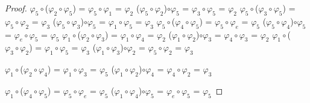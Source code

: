 \documentclass[10pt,a4paper,oneside]{article}
\begin{document}
\begin{proof}
				\newline
				\newline
				$\varphi_{5}\circ$($\varphi_{2}\circ\varphi_{5}$) = $\varphi_{5}\circ\varphi_{1}$ = $\varphi_{2}$
				\newline
				($\varphi_{5}\circ\varphi_{2}$)$\circ\varphi_{5}$ = $\varphi_{3}\circ\varphi_{5}$ = $\varphi_{2}$
				\newline
				\newline
				$\varphi_{5}\circ$($\varphi_{3}\circ\varphi_{5}$) = $\varphi_{5}\circ\varphi_{2}$ = $\varphi_{3}$
				\newline
				($\varphi_{5}\circ\varphi_{3}$)$\circ\varphi_{5}$ = $\varphi_{1}\circ\varphi_{5}$ = $\varphi_{3}$
				\newline
				\newline
				$\varphi_{5}\circ$($\varphi_{4}\circ\varphi_{5}$) = $\varphi_{5}\circ\varphi_{e}$ = $\varphi_{5}$
				\newline
				($\varphi_{5}\circ\varphi_{4}$)$\circ\varphi_{5}$ = $\varphi_{e}\circ\varphi_{5}$ = $\varphi_{5}$
				\newline
				\newline
				$\varphi_{1}\circ$($\varphi_{2}\circ\varphi_{3}$) = $\varphi_{1}\circ\varphi_{4}$ = $\varphi_{2}$
				\newline
				($\varphi_{1}\circ\varphi_{2}$)$\circ\varphi_{3}$ = $\varphi_{4}\circ\varphi_{3}$ = $\varphi_{2}$
				\newline
				\newline
				$\varphi_{1}\circ$($\varphi_{3}\circ\varphi_{2}$) = $\varphi_{1}\circ\varphi_{5}$ = $\varphi_{3}$
				\newline
				($\varphi_{1}\circ\varphi_{3}$)$\circ\varphi_{2}$ = $\varphi_{5}\circ\varphi_{2}$ = $\varphi_{3}$
				\newline
				\newline

				
				$\varphi_{1}\circ$($\varphi_{2}\circ\varphi_{4}$) = $\varphi_{1}\circ\varphi_{3}$ = $\varphi_{5}$
				\newline
				($\varphi_{1}\circ\varphi_{2}$)$\circ\varphi_{4}$ = $\varphi_{4}\circ\varphi_{2}$ = $\varphi_{3}$
				\newline
				\newline


				$\varphi_{1}\circ$($\varphi_{4}\circ\varphi_{5}$) = $\varphi_{5}\circ\varphi_{e}$ = $\varphi_{5}$
				\newline
				($\varphi_{1}\circ\varphi_{4}$)$\circ\varphi_{5}$ = $\varphi_{e}\circ\varphi_{5}$ = $\varphi_{5}$
				\newline
				\newline


\end{proof}
\end{document}
